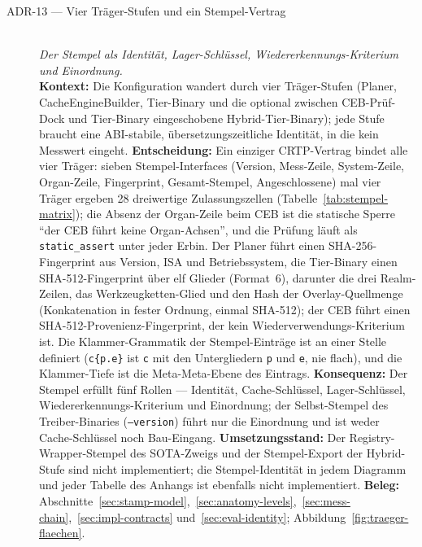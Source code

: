 \begin{description}
  \item[ADR-13 --- Vier Träger-Stufen und ein Stempel-Vertrag]\hfill\\
  \emph{Der Stempel als Identität, Lager-Schlüssel, Wiedererkennungs-Kriterium und Einordnung.}\hfill\\
  \textbf{Kontext:} Die Konfiguration wandert durch vier Träger-Stufen (Planer, CacheEngineBuilder,
  Tier-Binary und die optional zwischen CEB-Prüf-Dock und Tier-Binary eingeschobene Hybrid-Tier-Binary);
  jede Stufe braucht eine ABI-stabile, übersetzungszeitliche Identität, in die kein Messwert eingeht.
  \textbf{Entscheidung:} Ein einziger CRTP-Vertrag bindet alle vier Träger: sieben Stempel-Interfaces
  (Version, Mess-Zeile, System-Zeile, Organ-Zeile, Fingerprint, Gesamt-Stempel, Angeschlossene) mal
  vier Träger ergeben 28 dreiwertige Zulassungszellen (Tabelle~\ref{tab:stempel-matrix}); die Absenz
  der Organ-Zeile beim CEB ist die statische Sperre \enquote{der CEB führt keine Organ-Achsen}, und
  die Prüfung läuft als \texttt{static\_assert} unter jeder Erbin. Der Planer führt einen
  SHA-256-Fingerprint aus Version, ISA und Betriebssystem, die Tier-Binary einen SHA-512-Fingerprint
  über elf Glieder (Format~6), darunter die drei Realm-Zeilen, das Werkzeugketten-Glied und den Hash
  der Overlay-Quellmenge (Konkatenation in fester Ordnung, einmal SHA-512); der CEB führt einen
  SHA-512-Provenienz-Fingerprint, der kein Wiederverwendungs-Kriterium ist. Die Klammer-Grammatik der
  Stempel-Einträge ist an einer Stelle definiert (\texttt{c\{p.e\}} ist \texttt{c} mit den Untergliedern \texttt{p} und
  \texttt{e}, nie flach), und die Klammer-Tiefe ist die Meta-Meta-Ebene des Eintrags.
  \textbf{Konsequenz:} Der Stempel erfüllt fünf Rollen --- Identität, Cache-Schlüssel, Lager-Schlüssel,
  Wiedererkennungs-Kriterium und Einordnung; der Selbst-Stempel des Treiber-Binaries (\texttt{--version}) führt nur
  die Einordnung und ist weder Cache-Schlüssel noch Bau-Eingang.
  \textbf{Umsetzungsstand:} Der Registry-Wrapper-Stempel des SOTA-Zweigs und der Stempel-Export der
  Hybrid-Stufe sind nicht implementiert; die Stempel-Identität in jedem Diagramm und jeder Tabelle des
  Anhangs ist ebenfalls nicht implementiert.
  \textbf{Beleg:} Abschnitte~\ref{sec:stamp-model},~\ref{sec:anatomy-levels},~\ref{sec:mess-chain},~\ref{sec:impl-contracts}
  und~\ref{sec:eval-identity}; Abbildung~\ref{fig:traeger-flaechen}.


\end{description}
